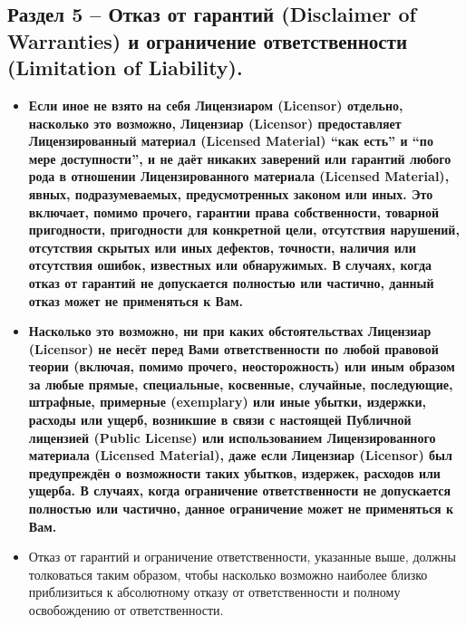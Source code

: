 \subsection*{Раздел 5 -- Отказ от гарантий (Disclaimer of Warranties) и ограничение ответственности (Limitation of Liability).}
\begin{itemize}
\item[\textbf{a.}] \textbf{Если иное не взято на себя Лицензиаром (Licensor) отдельно, насколько это возможно, Лицензиар (Licensor) предоставляет Лицензированный материал (Licensed Material) ``как есть'' и ``по мере доступности'', и не даёт никаких заверений или гарантий любого рода в отношении Лицензированного материала (Licensed Material), явных, подразумеваемых, предусмотренных законом или иных. Это включает, помимо прочего, гарантии права собственности, товарной пригодности, пригодности для конкретной цели, отсутствия нарушений, отсутствия скрытых или иных дефектов, точности, наличия или отсутствия ошибок, известных или обнаружимых. В случаях, когда отказ от гарантий не допускается полностью или частично, данный отказ может не применяться к Вам.}
\item[\textbf{b.}] \textbf{Насколько это возможно, ни при каких обстоятельствах Лицензиар (Licensor) не несёт перед Вами ответственности по любой правовой теории (включая, помимо прочего, неосторожность) или иным образом за любые прямые, специальные, косвенные, случайные, последующие, штрафные, примерные (exemplary) или иные убытки, издержки, расходы или ущерб, возникшие в связи с настоящей Публичной лицензией (Public License) или использованием Лицензированного материала (Licensed Material), даже если Лицензиар (Licensor) был предупреждён о возможности таких убытков, издержек, расходов или ущерба. В случаях, когда ограничение ответственности не допускается полностью или частично, данное ограничение может не применяться к Вам.}
\item[c.] Отказ от гарантий и ограничение ответственности, указанные выше, должны толковаться таким образом, чтобы насколько возможно наиболее близко приблизиться к абсолютному отказу от ответственности и полному освобождению от ответственности.
\end{itemize}

